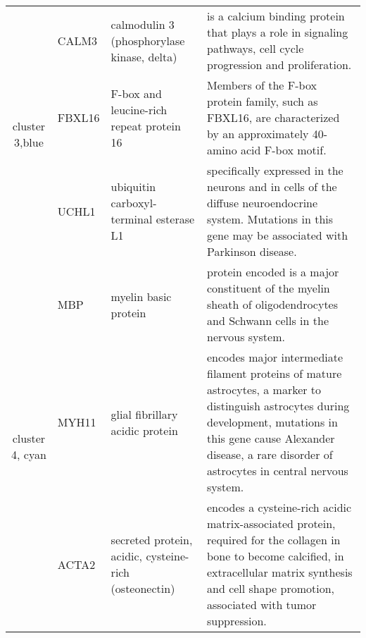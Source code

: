\begin{table}[htdp]
\begin{center}
\begin{tabular}{|c|p{0.5in}|p{1.4in}|p{3.6in}|}
 \multirow{3}{4em}{\small{cluster 3,blue}}  &  \small{CALM3} & \footnotesize{calmodulin 3 (phosphorylase kinase, delta)} & \scriptsize{ is a calcium binding protein that plays a role in signaling pathways, cell cycle progression and proliferation.}   \\ 
 					      & \small{FBXL16} &  \footnotesize{F-box and leucine-rich repeat protein 16} & \scriptsize{ Members of the F-box protein family, such as FBXL16, are characterized by an approximately 40-amino acid F-box motif.} \\
					      & \small{UCHL1} & \footnotesize{ubiquitin carboxyl-terminal esterase L1} & \scriptsize{specifically expressed in the neurons and in cells of the diffuse neuroendocrine system. Mutations in this gene may be associated with Parkinson disease.} \\
 \hline
 \multirow{3}{4em}{\small{cluster 4, cyan}} & \small{MBP} & \footnotesize{myelin basic protein} & \scriptsize{protein encoded is a major constituent of the myelin sheath of oligodendrocytes and Schwann cells in the nervous system.} \\
 					    & \small{MYH11} & \footnotesize{glial fibrillary acidic protein} & \scriptsize{ encodes major intermediate filament proteins of mature astrocytes, a marker to distinguish astrocytes during development, mutations in this gene cause Alexander disease, a rare disorder of astrocytes in central nervous system.} \\
					    & \small{ACTA2}  & \footnotesize{secreted protein, acidic, cysteine-rich (osteonectin)}  & \scriptsize{encodes a cysteine-rich acidic matrix-associated protein, required for the collagen in bone to become calcified, in extracellular matrix synthesis and cell shape promotion, associated with tumor suppression.}\\
\hline
\end{tabular}
 \end{center} \label{tab:tab2}
\end{table}



